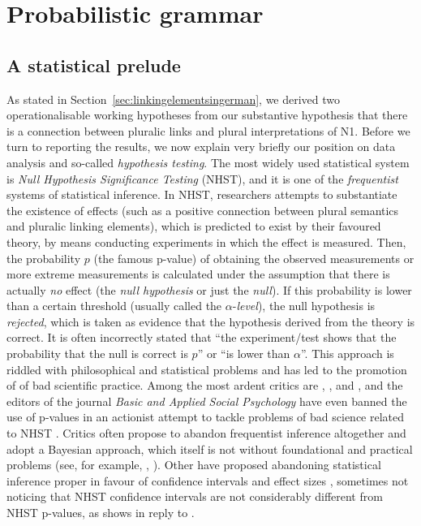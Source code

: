 \section{Probabilistic grammar}
\label{sec:probabilisticgrammar}


\subsection{A statistical prelude}
\label{ssub:astatisticalprelude}

As stated in Section~\ref{sec:linkingelementsingerman}, we derived two operationalisable working hypotheses from our substantive hypothesis that there is a connection between pluralic links and plural interpretations of N1.
Before we turn to reporting the results, we now explain very briefly our position on data analysis and so-called \textit{hypothesis testing}.
The most widely used statistical system is \textit{Null Hypothesis Significance Testing} (NHST), and it is one of the \textit{frequentist} systems of statistical inference.
In NHST, researchers attempts to substantiate the existence of effects (such as a positive connection between plural semantics and pluralic linking elements), which is predicted to exist by their favoured theory, by means conducting experiments in which the effect is measured.
Then, the probability $p$ (the famous p-value) of obtaining the observed measurements or more extreme measurements is calculated under the assumption that there is actually \textit{no} effect (the \textit{null hypothesis} or just the \textit{null}).
If this probability is lower than a certain threshold (usually called the $\alpha$-\textit{level}), the null hypothesis is \textit{rejected}, which is taken as evidence that the hypothesis derived from the theory is correct.
It is often incorrectly stated that ``the experiment\slash test shows that the probability that the null is correct is $p$'' or ``is lower than $\alpha$''.
This approach is riddled with philosophical and statistical problems and has led to the promotion of of bad scientific practice.
Among the most ardent critics are \textcite{Gigerenzer2004}, \textcite{Colquhoun2014}, and \textcite{MunafoEa2017}, and the editors of the journal \textit{Basic and Applied Social Psychology} have even banned the use of p-values in an actionist attempt to tackle problems of bad science related to NHST \parencite{TrafimowMarks2016}.
Critics often propose to abandon frequentist inference altogether and adopt a Bayesian approach, which itself is not without foundational and practical problems (see, for example, \citealt{Mayo1996}, \citealt{Senn2011}).
Other have proposed abandoning statistical inference proper in favour of confidence intervals and effect sizes \parencite{Cumming2014}, sometimes not noticing that NHST confidence intervals are not considerably different from NHST p-values, as \textcite{Perezgonzalez2015b} shows in reply to \textcite{Cumming2014}.

